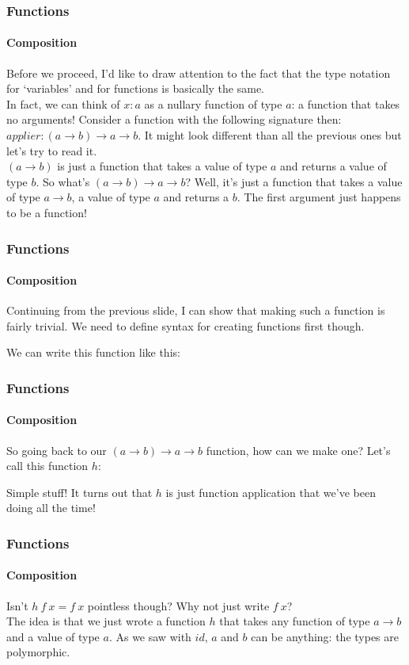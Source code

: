 \documentclass{beamer}
\begin{document}
\begin{frame}
  \frametitle{Functions}
  \framesubtitle{Composition}
  Before we proceed, I'd like to draw attention to the fact that the
  type notation for `variables' and for functions is basically the
  same.\\
  \pause
  In fact, we can think of $x:a$ as a nullary function of type $a$: a function that takes
  no arguments! Consider a function with the following signature then:
  $applier:(a \rightarrow b) \rightarrow a \rightarrow b$. It might
  look different than all the previous ones but let's try to read
  it.\\
  \pause
  $(a \rightarrow b)$ is just a function that takes a value of type
  $a$ and returns a value of type $b$. So what's $(a \rightarrow b)
  \rightarrow a \rightarrow b$? \pause
  Well, it's just a function that takes a value of
  type $a \rightarrow b$, a value of type $a$ and returns a $b$. The
  first argument just happens to be a function!\\
\end{frame}
\begin{frame}
  \frametitle{Functions}
  \framesubtitle{Composition}
  Continuing from the previous slide, I can show that making such a
  function is fairly trivial. We need to define syntax for creating
  functions first though.\\
  \pause
  
  We can write this function like this:
  
\end{frame}
\begin{frame}
  \frametitle{Functions}
  \framesubtitle{Composition}
  So going back to our $(a \rightarrow b)
  \rightarrow a \rightarrow b$ function, how can we make one? Let's
  call this function $h$:
  
  \pause
  Simple stuff! It turns out that $h$ is just function application
  that we've been doing all the time!
\end{frame}
\begin{frame}
  \frametitle{Functions}
  \framesubtitle{Composition}
  Isn't $h\:f\:x = f\:x$ pointless though? Why not just write $f\:x$?\\
  \pause
  The idea is that we just wrote a function $h$ that takes any
  function of type $a \rightarrow b$ and a value of type $a$. As we saw with $id$,
  $a$ and $b$ can be anything: the types are polymorphic.
\end{frame}
\end{document}
